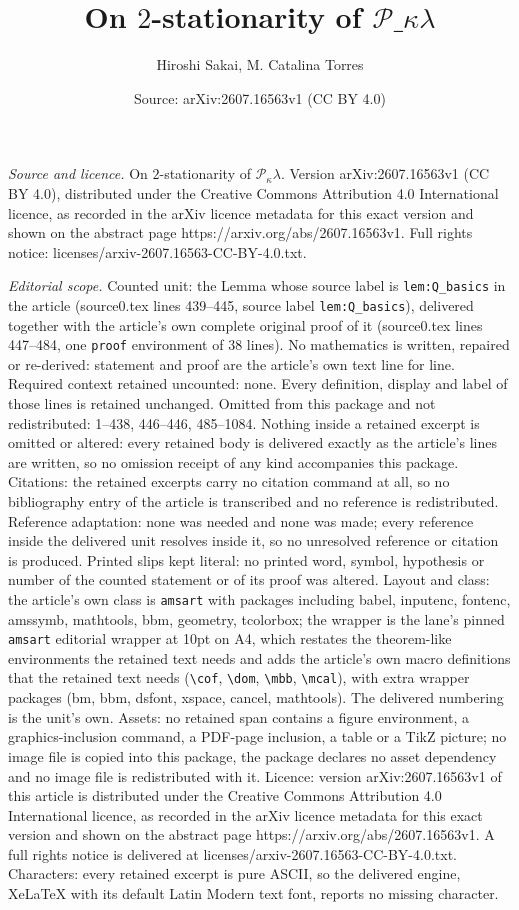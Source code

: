 \documentclass[10pt,a4paper]{amsart}
\title[On $2$-stationarity of $\mathcal{P}\_{\kappa}\lambda$]{On $2$-stationarity of $\mathcal{P}\_{\kappa}\lambda$}
\author{Hiroshi Sakai, M. Catalina Torres}
\date{Source: arXiv:2607.16563v1 (CC BY 4.0)}
\begin{document}
\maketitle

\noindent\emph{Source and licence.} On $2$-stationarity of $\mathcal{P}_{\kappa}\lambda$. Version arXiv:2607.16563v1 (CC BY 4.0), distributed under the Creative Commons Attribution 4.0 International licence, as recorded in the arXiv licence metadata for this exact version and shown on the abstract page https://arxiv.org/abs/2607.16563v1. Full rights notice: licenses/arxiv-2607.16563-CC-BY-4.0.txt.\par\smallskip

\noindent\textit{Editorial scope.} Counted unit: the Lemma whose source label is \texttt{lem:Q\_basics} in the article (source0.tex lines 439--445, source label \texttt{lem:Q\_basics}), delivered together with the article's own complete original proof of it (source0.tex lines 447--484, one \texttt{proof} environment of 38 lines). No mathematics is written, repaired or re-derived: statement and proof are the article's own text line for line. Required context retained uncounted: none. Every definition, display and label of those lines is retained unchanged. Omitted from this package and not redistributed: 1--438, 446--446, 485--1084. Nothing inside a retained excerpt is omitted or altered: every retained body is delivered exactly as the article's lines are written, so no omission receipt of any kind accompanies this package. Citations: the retained excerpts carry no citation command at all, so no bibliography entry of the article is transcribed and no reference is redistributed. Reference adaptation: none was needed and none was made; every reference inside the delivered unit resolves inside it, so no unresolved reference or citation is produced. Printed slips kept literal: no printed word, symbol, hypothesis or number of the counted statement or of its proof was altered. Layout and class: the article's own class is \texttt{amsart} with packages including babel, inputenc, fontenc, amssymb, mathtools, bbm, geometry, tcolorbox; the wrapper is the lane's pinned \texttt{amsart} editorial wrapper at 10pt on A4, which restates the theorem-like environments the retained text needs and adds the article's own macro definitions that the retained text needs (\texttt{\textbackslash cof}, \texttt{\textbackslash dom}, \texttt{\textbackslash mbb}, \texttt{\textbackslash mcal}), with extra wrapper packages (bm, bbm, dsfont, xspace, cancel, mathtools). The delivered numbering is the unit's own. Assets: no retained span contains a figure environment, a graphics-inclusion command, a PDF-page inclusion, a table or a TikZ picture; no image file is copied into this package, the package declares no asset dependency and no image file is redistributed with it. Licence: version arXiv:2607.16563v1 of this article is distributed under the Creative Commons Attribution 4.0 International licence, as recorded in the arXiv licence metadata for this exact version and shown on the abstract page https://arxiv.org/abs/2607.16563v1. A full rights notice is delivered at licenses/arxiv-2607.16563-CC-BY-4.0.txt. Characters: every retained excerpt is pure ASCII, so the delivered engine, XeLaTeX with its default Latin Modern text font, reports no missing character.
\end{document}
